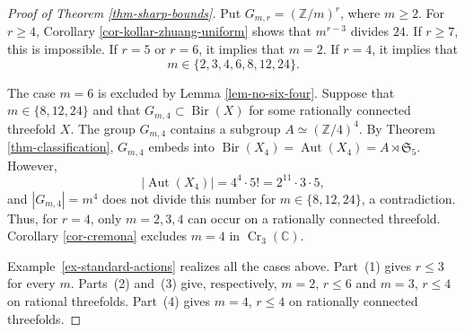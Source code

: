 \documentclass[10pt,oneside,reqno]{amsart}
\numberwithin{equation}{section}
\theoremstyle{definition}
\newcommand{\Z}{\mathbb Z}
\newcommand{\C}{\mathbb C}
\newcommand{\Cr}{\operatorname{Cr}}
\begin{document}
\begin{proof}[Proof of Theorem \ref{thm-sharp-bounds}]
Put $G_{m,r}=(\Z/m)^r$, where $m\geq2$.  For $r\geq4$, Corollary
\ref{cor-kollar-zhuang-uniform} shows that $m^{r-3}$ divides $24$.
If $r\geq7$, this is impossible.  If $r=5$ or $r=6$, it implies that
$m=2$.  If $r=4$, it implies that
\[
 m\in\{2,3,4,6,8,12,24\}.
\]

The case $m=6$ is excluded by Lemma \ref{lem-no-six-four}.  Suppose
that $m\in\{8,12,24\}$ and that
$G_{m,4}\subset\operatorname{Bir}(X)$ for some rationally connected
threefold $X$.  The group $G_{m,4}$ contains a subgroup
$A\simeq(\Z/4)^4$.  By Theorem \ref{thm-classification},
$G_{m,4}$ embeds into
$\operatorname{Bir}(X_4)=\operatorname{Aut}(X_4)
=A\rtimes\mathfrak S_5$.
However,
\[
 |\operatorname{Aut}(X_4)|=4^4\cdot5!=2^{11}\cdot3\cdot5,
\]
and $|G_{m,4}|=m^4$ does not divide this number for
$m\in\{8,12,24\}$, a contradiction.  Thus,
for $r=4$, only $m=2,3,4$ can occur on a rationally connected
threefold.  Corollary \ref{cor-cremona} excludes $m=4$ in
$\Cr_3(\C)$.

Example~\ref{ex-standard-actions} realizes all the cases above.
Part~(1) gives $r\leq3$ for every $m$. Parts~(2) and~(3) give,
respectively, $m=2$, $r\leq6$ and $m=3$, $r\leq4$ on rational
threefolds. Part~(4) gives $m=4$, $r\leq4$ on rationally
connected threefolds.
\end{proof}
\end{document}
